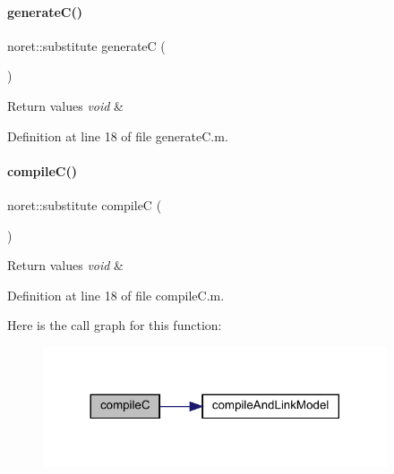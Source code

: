 \paragraph{\texorpdfstring{generate\+C()}{generateC()}}
{\footnotesize\ttfamily noret\+::substitute generateC (\begin{DoxyParamCaption}{ }\end{DoxyParamCaption})}


\begin{DoxyRetVals}{Return values}
{\em void} & \\
\hline
\end{DoxyRetVals}


Definition at line 18 of file generate\+C.\+m.

\mbox{\label{classamimodel_abf720a0c3104977029538e3b19d429bb}} 
\paragraph{\texorpdfstring{compile\+C()}{compileC()}}
{\footnotesize\ttfamily noret\+::substitute compileC (\begin{DoxyParamCaption}{ }\end{DoxyParamCaption})}


\begin{DoxyRetVals}{Return values}
{\em void} & \\
\hline
\end{DoxyRetVals}


Definition at line 18 of file compile\+C.\+m.

Here is the call graph for this function\+:
\nopagebreak
\begin{figure}[H]
\begin{center}
\leavevmode
\includegraphics[width=288pt]{classamimodel_abf720a0c3104977029538e3b19d429bb_cgraph}
\end{center}
\end{figure}
\mbox{\label{classamimodel_a6e93ea24824d9d90c322960e6d78fed0}} 
